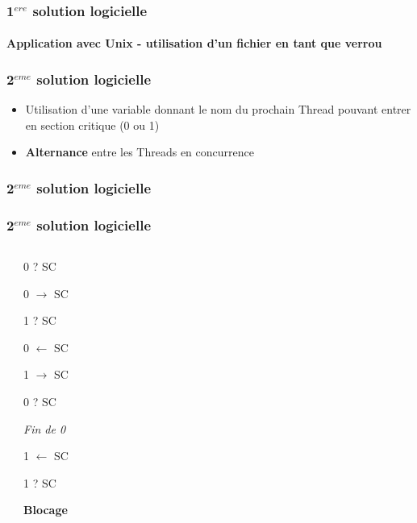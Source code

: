 \begin{frame}
\frametitle{1$^{ere}$ solution logicielle}
\framesubtitle{Application avec Unix - utilisation d'un fichier en tant que verrou}
\begin{scriptsize}\end{scriptsize}
\end{frame}

\begin{frame}
\frametitle{2$^{eme}$ solution logicielle}
\begin{itemize}
\item Utilisation d’une variable donnant le nom du prochain Thread pouvant entrer en section critique (0 ou 1)
\item \textbf{Alternance} entre les Threads en concurrence
\end{itemize}
\end{frame}

\begin{frame}
\frametitle{2$^{eme}$ solution logicielle}
\begin{scriptsize}\end{scriptsize}
\end{frame}

\begin{frame}
\frametitle{2$^{eme}$ solution logicielle}
\begin{columns}
\begin{scriptsize}\end{scriptsize}
\begin{itemize}
\begin{scriptsize}
\item 0 ? SC
\item 0 $\rightarrow$ SC
\item 1 ? SC
\item 0 $\leftarrow$ SC
\item 1 $\rightarrow$ SC
\item 0 ? SC
\item \textit{Fin de 0}
\item 1 $\leftarrow$ SC
\item 1 ? SC
\item \textbf{Blocage}
\end{scriptsize}
\end{itemize}
\end{columns}
\end{frame}

